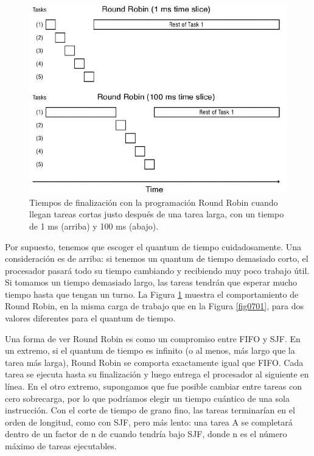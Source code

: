 \documentclass[10pt]{book}
\begin{document}
\begin{figure}[tbhp]
\centerline{\includegraphics[scale=0.70]{img/fig0702}}
\caption{Tiempos de finalización con la programación Round Robin cuando llegan tareas cortas justo después de una tarea larga, con un tiempo de 1 ms (arriba) y 100 ms (abajo).}
\label{fig0702}
\end{figure}

Por supuesto, tenemos que escoger el quantum de tiempo cuidadosamente. Una consideración es de arriba: si tenemos un quantum de tiempo demasiado corto, el procesador pasará todo su tiempo cambiando y recibiendo muy poco trabajo útil. Si tomamos un tiempo demasiado largo, las tareas tendrán que esperar mucho tiempo hasta que tengan un turno. La Figura \ref{fig0702} muestra el comportamiento de Round Robin, en la misma carga de trabajo que en la Figura \ref{fig0701}, para dos valores diferentes para el quantum de tiempo.

Una forma de ver Round Robin es como un compromiso entre FIFO y SJF. En un extremo, si el quantum de tiempo es infinito (o al menos, más largo que la tarea más larga), Round Robin se comporta exactamente igual que FIFO. Cada tarea se ejecuta hasta su finalización y luego entrega el procesador al siguiente en línea. En el otro extremo, supongamos que fue posible cambiar entre tareas con cero sobrecarga, por lo que podríamos elegir un tiempo cuántico de una sola instrucción. Con el corte de tiempo de grano fino, las tareas terminarían en el orden de longitud, como con SJF, pero más lento: una tarea A se completará dentro de un factor de n de cuando tendría bajo SJF, donde n es el número máximo de tareas ejecutables.
\end{document}
